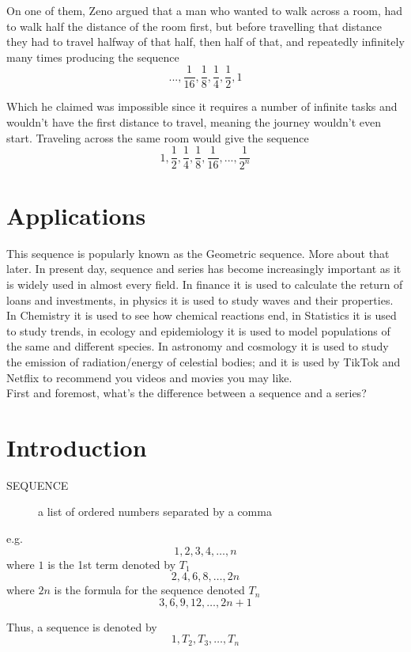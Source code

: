 \documentclass[
  letterpaper,
  DIV=11,
  numbers=noendperiod]{scrreprt}
\begin{document}
On one of them, Zeno argued that a man who wanted to walk across a room,
had to walk half the distance of the room first, but before travelling
that distance they had to travel halfway of that half, then half of
that, and repeatedly infinitely many times producing the sequence \[
...,\frac{1}{16},\frac{1}{8},\frac{1}{4},\frac{1}{2},1
\]

Which he claimed was impossible since it requires a number of infinite
tasks and wouldn't have the first distance to travel, meaning the
journey wouldn't even start. Traveling across the same room would give
the sequence \[
1,\frac{1}{2},\frac{1}{4},\frac{1}{8},\frac{1}{16},...,\frac{1}{2^n}
\]

\section{Applications}\label{applications-1}

This sequence is popularly known as the Geometric sequence. More about
that later. In present day, sequence and series has become increasingly
important as it is widely used in almost every field. In finance it is
used to calculate the return of loans and investments, in physics it is
used to study waves and their properties. In Chemistry it is used to see
how chemical reactions end, in Statistics it is used to study trends, in
ecology and epidemiology it is used to model populations of the same and
different species. In astronomy and cosmology it is used to study the
emission of radiation/energy of celestial bodies; and it is used by
TikTok and Netflix to recommend you videos and movies you may like.\\
First and foremost, what's the difference between a sequence and a
series?

\section{Introduction}\label{introduction}

\begin{description}
\item[SEQUENCE]
a list of ordered numbers separated by a comma
\end{description}

e.g.~\[1,2,3,4,…,𝑛\] where \(1\) is the 1st term denoted by \(T_1\)
\[2,4,6,8,…,2n\] where \(2n\) is the formula for the sequence denoted
\(𝑇_𝑛\) \[3,6,9,12,…,2𝑛+1\]

Thus, a sequence is denoted by \[
1, 𝑇_2, 𝑇_3,…,𝑇_𝑛 
\]
\end{document}
